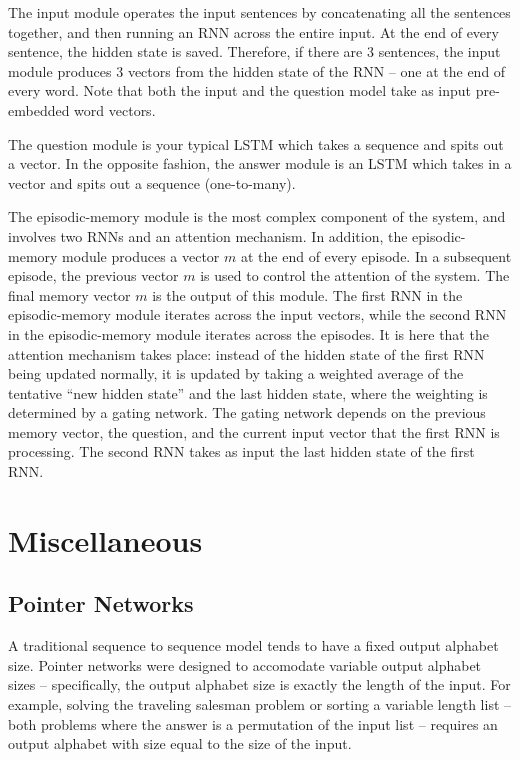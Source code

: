 \documentclass[12pt]{article}
\begin{document}
The input module operates the input sentences by concatenating all the sentences together, and then running an RNN across the entire input. At the end of every sentence, the hidden state is saved. Therefore, if there are 3 sentences, the input module produces 3 vectors from the hidden state of the RNN -- one at the end of every word. Note that both the input and the question model take as input pre-embedded word vectors. 

The question module is your typical LSTM which takes a sequence and spits out a vector. In the opposite fashion, the answer module is an LSTM which takes in a vector and spits out a sequence (one-to-many).

The episodic-memory module is the most complex component of the system, and involves two RNNs and an attention mechanism. In addition, the episodic-memory module produces a vector $m$ at the end of every episode. In a subsequent episode, the previous vector $m$ is used to control the attention of the system. The final memory vector $m$ is the output of this module. The first RNN in the episodic-memory module iterates across the input vectors, while the second RNN in the episodic-memory module iterates across the episodes. It is here that the attention mechanism takes place: instead of the hidden state of the first RNN being updated normally, it is updated by taking a weighted average of the tentative ``new hidden state'' and the last hidden state, where the weighting is determined by a gating network. The gating network depends on the previous memory vector, the question, and the current input vector that the first RNN is processing. The second RNN takes as input the last hidden state of the first RNN. 

\section{Miscellaneous}

\subsection{Pointer Networks \cite{PointerNetworks}}

A traditional sequence to sequence model tends to have a fixed output alphabet size. Pointer networks were designed to accomodate variable output alphabet sizes -- specifically, the output alphabet size is exactly the length of the input. For example, solving the traveling salesman problem or sorting a variable length list -- both problems where the answer is a permutation of the input list -- requires an output alphabet with size equal to the size of the input.
\end{document}
